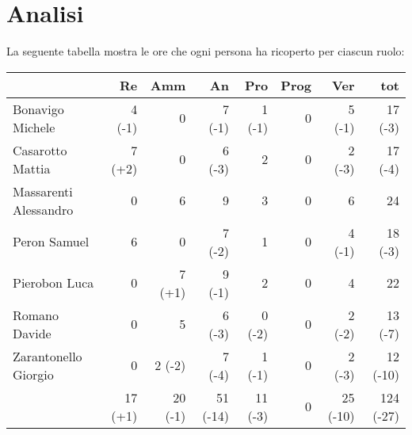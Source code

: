 \section{Analisi}

La seguente tabella mostra le ore che ogni persona ha ricoperto per ciascun ruolo:
\begin{table}[ht]
    \begin{tabularx}{\linewidth}{X|rrrrrrr}
    \rowcolor{gray!30}& Re & Amm & An & Pro & Prog & Ver & tot \\
    \hline
    Bonavigo Michele                        & 4 (-1)   & 0          & 7 (-1)       & 1 (-1)     & 0     & 5 (-1)   & 17 (-3) \\

    \rowcolor{gray!10}Casarotto Mattia      & 7 (+2)   & 0          & 6 (-3)       & 2          & 0     & 2 (-3)   & 17 (-4) \\

    Massarenti Alessandro                   & 0        & 6          & 9            & 3          & 0     & 6        & 24 \\ 

    \rowcolor{gray!10}Peron Samuel          & 6        & 0          & 7 (-2)       & 1          & 0     & 4 (-1)   & 18 (-3) \\ 

    Pierobon Luca                           & 0        & 7 (+1)     & 9 (-1)       & 2          & 0     & 4        & 22 \\ 

    \rowcolor{gray!10}Romano Davide         & 0        & 5          & 6 (-3)       & 0 (-2)     & 0     & 2 (-2)   & 13 (-7)\\

    Zarantonello Giorgio                    & 0        & 2 (-2)     & 7 (-4)       & 1 (-1)     & 0     & 2 (-3)   & 12 (-10)\\

    \hline                                  & 17 (+1)  & 20 (-1)    & 51 (-14)     & 11 (-3)    & 0     & 25 (-10)  & 124 (-27)\\  
    \end{tabularx}
\end{table}

